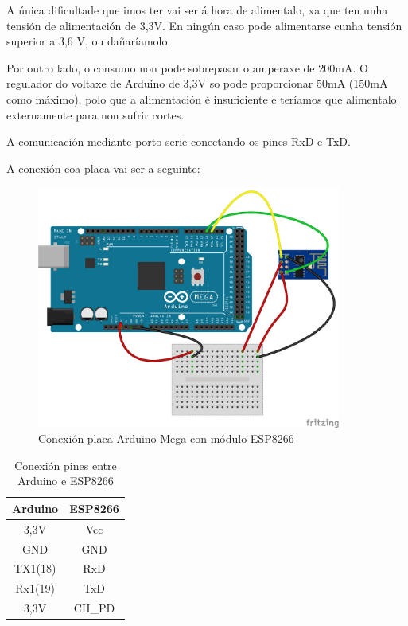 \documentclass[11pt,twoside]{book}
\begin{document}
A única dificultade que imos ter vai ser á hora de alimentalo, xa que ten unha tensión de alimentación de 3,3V. En ningún caso pode alimentarse cunha tensión superior a 3,6 V, ou dañaríamolo.

Por outro lado, o consumo non pode sobrepasar o amperaxe de 200mA. O regulador do voltaxe de Arduino de 3,3V so pode proporcionar 50mA (150mA como máximo), polo que a alimentación é insuficiente e teríamos que alimentalo externamente para non sufrir cortes.

A comunicación mediante porto serie conectando os pines RxD e TxD.

A conexión coa placa vai ser a seguinte:

\begin{figure}[H]
	\begin{center}
		\includegraphics[width=10cm]{images/conexionArduinoESP8266_WiFiEsp.png}
	\end{center}
	\caption{Conexión placa Arduino Mega con módulo ESP8266}
	\label{fig:ConexionESP8266}
\end{figure}

\begin{table}[htbt]
\begin{center}
\begin{tabular}{|c|c|}
\hline
Arduino & ESP8266 \\
\hline
3,3V & Vcc \\
\hline
GND & GND \\
\hline
TX1(18) & RxD \\
\hline
Rx1(19) & TxD \\
\hline
3,3V & CH\_PD \\
\hline
\end{tabular}
\caption{Conexión pines entre Arduino e ESP8266}
\label{TablaArduinoESP8266_WiFiEsp}
\end{center}
\end{table}
\end{document}
